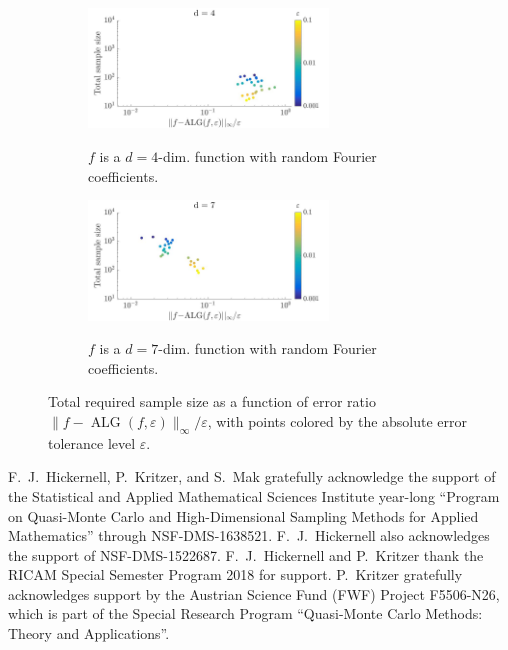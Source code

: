 \documentclass[USenglish]{article}
\theoremstyle{dgthm}
\theoremstyle{dgthm}
\theoremstyle{dgthm}
\theoremstyle{dgthm}
\theoremstyle{dgdef}
\theoremstyle{definition}
\DeclareMathOperator{\ALG}{ALG}
\newcommand{\DHKMchange}[1]{{\color{red}{#1}}}
\begin{document}
\begin{figure}
\centering
\begin{subfigure}{\textwidth}
\centering
\includegraphics[width=0.7\textwidth]{d4}
\label{fig:four1}
\caption{$f$ is a $d=4$-dim. function with random Fourier coefficients.}
\end{subfigure}
\begin{subfigure}{\textwidth}
\centering
\includegraphics[width=0.7\textwidth]{d7}
\label{fig:four2}
\caption{$f$ is a $d=7$-dim. function with random Fourier coefficients.}
\end{subfigure}
\caption{Total required sample size as a function of error ratio $\|f - \ALG(f,\varepsilon)\|_{\infty}/\varepsilon$, with points colored by the absolute error tolerance level $\varepsilon$.}
\label{fig:four}
\end{figure}

\begin{acknowledgement}
\DHKMchange{The authors would like to thank two anonymous referees for their suggestions which helped to improve the presentation of the results.}

F.~J.~Hickernell, P.~Kritzer, and S.~Mak gratefully acknowledge the support of the Statistical and Applied Mathematical Sciences Institute year-long ``Program on Quasi-Monte Carlo and High-Dimensional Sampling Methods for Applied Mathematics'' through NSF-DMS-1638521.  F.~J.~Hickernell also acknowledges the support of NSF-DMS-1522687.
F.~J.~Hickernell and P.~Kritzer thank the RICAM Special Semester Program 2018 for support. P.~Kritzer gratefully acknowledges support by the Austrian Science Fund (FWF) Project  F5506-N26, which is part of the Special Research Program ``Quasi-Monte Carlo Methods: Theory and Applications''.
\end{acknowledgement}





\end{document}
